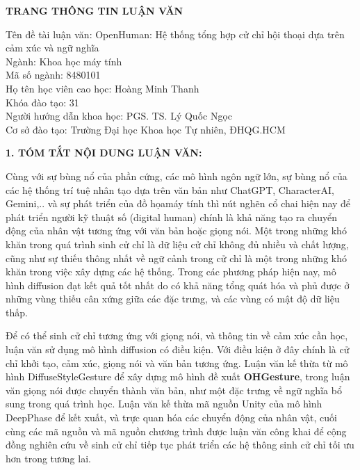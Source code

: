 {}
\begin{center}
{\centering \MakeUppercase \LARGE \fontsize{16.16}{19.26}\selectfont \bfseries TRANG THÔNG TIN LUẬN VĂN}
\end{center}
{
\setlength{\parindent}{0pt}
Tên đề tài luận văn: OpenHuman: Hệ thống tổng hợp cử chỉ hội thoại dựa trên cảm xúc và ngữ nghĩa \\
Ngành: Khoa học máy tính \\
Mã số ngành:  8480101 \\
Họ tên học viên cao học: Hoàng Minh Thanh \\
Khóa đào tạo: 31 \\
Người hướng dẫn khoa học: PGS. TS. Lý Quốc Ngọc \\
Cơ sở đào tạo: Trường Đại học Khoa học Tự nhiên, ĐHQG.HCM}

\vspace{10pt}
{\MakeUppercase \Large \bfseries 1. TÓM TẮT NỘI DUNG LUẬN VĂN:}

Cùng với sự bùng nổ của phần cứng, các mô hình ngôn ngữ lớn, sự bùng nổ của các hệ thống trí tuệ nhân tạo dựa trên văn bản như ChatGPT, CharacterAI, Gemini,..  và sự phát triển của đồ họamáy tính thì nút nghẽn cổ chai hiện nay để phát triển người kỹ thuật số (digital human) chính là khả năng tạo ra chuyển động của nhân vật tương ứng với văn bản hoặc giọng nói.
Một trong những khó khăn trong quá trình sinh cử chỉ là dữ liệu cử chỉ không đủ nhiều và chất lượng, cũng như sự thiếu thông nhất về ngữ cảnh trong cử chỉ là một trong những khó khăn trong việc xây dựng các hệ thống. Trong các phương pháp hiện nay,  mô hình diffusion đạt kết quả tốt nhất do có khả năng tổng quát hóa và phủ được ở những vùng thiếu cân xứng giữa các đặc trưng, và các vùng có mật độ dữ liệu thấp.

 Để có thể sinh cử chỉ tương ứng với giọng nói, và thông tin về cảm xúc cần học, luận văn sử dụng mô hình diffusion có điều kiện. Với điều kiện ở đây chính là cử chỉ khởi tạo, cảm xúc, giọng nói và văn bản tương ứng.
Luận văn kế thừa từ mô hình DiffuseStyleGesture để xây dựng mô hình đề xuất \textbf{OHGesture}, trong luận văn giọng nói được chuyển thành văn bản, như một đặc trưng về ngữ nghĩa bổ sung trong quá trình học. Luận văn kế thừa mã nguồn Unity của mô hình DeepPhase để kết xuất, và trực quan hóa các chuyển động của nhân vật, cuối cùng các mã nguồn và mã nguồn chương trình được luận văn công khai để cộng đồng nghiên cứu về sinh cử chỉ tiếp tục phát triển các hệ thông sinh cử chỉ tối ưu hơn trong tương lai. 

